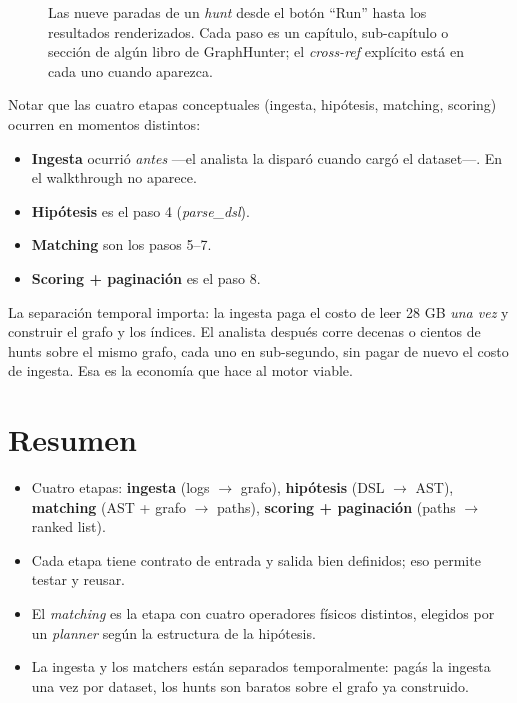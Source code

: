 \begin{figure}[H]
\caption{Las nueve paradas de un \emph{hunt} desde el botón ``Run''
hasta los resultados renderizados. Cada paso es un capítulo, sub-capítulo
o sección de algún libro de GraphHunter; el \emph{cross-ref} explícito
está en cada uno cuando aparezca.}
\label{fig:pipeline-walkthrough}
\end{figure}

\noindent
Notar que las cuatro etapas conceptuales (ingesta, hipótesis,
matching, scoring) ocurren en momentos distintos:

\begin{itemize}
    \item \textbf{Ingesta} ocurrió \emph{antes} ---el analista la
    disparó cuando cargó el dataset---. En el walkthrough no
    aparece.
    \item \textbf{Hipótesis} es el paso 4 (\emph{parse\_dsl}).
    \item \textbf{Matching} son los pasos 5--7.
    \item \textbf{Scoring + paginación} es el paso 8.
\end{itemize}

\noindent
La separación temporal importa: la ingesta paga el costo de leer 28
GB \emph{una vez} y construir el grafo y los índices. El analista
después corre decenas o cientos de hunts sobre el mismo grafo, cada
uno en sub-segundo, sin pagar de nuevo el costo de ingesta. Esa es
la economía que hace al motor viable.

\section{Resumen}

\begin{itemize}
    \item Cuatro etapas: \textbf{ingesta} (logs $\to$ grafo),
    \textbf{hipótesis} (DSL $\to$ AST), \textbf{matching} (AST + grafo
    $\to$ paths), \textbf{scoring + paginación} (paths $\to$ ranked
    list).
    \item Cada etapa tiene contrato de entrada y salida bien
    definidos; eso permite testar y reusar.
    \item El \emph{matching} es la etapa con cuatro operadores
    físicos distintos, elegidos por un \emph{planner} según la
    estructura de la hipótesis.
    \item La ingesta y los matchers están separados temporalmente:
    pagás la ingesta una vez por dataset, los hunts son baratos
    sobre el grafo ya construido.
\end{itemize}

